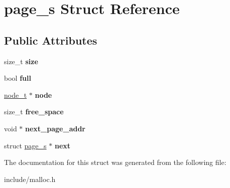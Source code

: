 \hypertarget{structpage__s}{}\section{page\+\_\+s Struct Reference}
\label{structpage__s}
\subsection*{Public Attributes}
\begin{DoxyCompactItemize}
\item 
\mbox{\label{structpage__s_ab310fb54811a60cec32ead1e75652935}} 
size\+\_\+t {\bfseries size}
\item 
\mbox{\label{structpage__s_a120fdcbea42f5293cd52b5fee39f73e4}} 
bool {\bfseries full}
\item 
\mbox{\label{structpage__s_ac3377cf2e060382cc6017a3ffcdb6fb3}} 
\hyperlink{structnode__s}{node\+\_\+t} $\ast$ {\bfseries node}
\item 
\mbox{\label{structpage__s_a70f32c9978c8c3c3ba1026b88d98d1c6}} 
size\+\_\+t {\bfseries free\+\_\+space}
\item 
\mbox{\label{structpage__s_aa97fd3b48d4d8ddbd2bb65d9ca485225}} 
void $\ast$ {\bfseries next\+\_\+page\+\_\+addr}
\item 
\mbox{\label{structpage__s_adab271597dd53733647e69e90089895c}} 
struct \hyperlink{structpage__s}{page\+\_\+s} $\ast$ {\bfseries next}
\end{DoxyCompactItemize}


The documentation for this struct was generated from the following file\+:\begin{DoxyCompactItemize}
\item 
include/malloc.\+h\end{DoxyCompactItemize}
